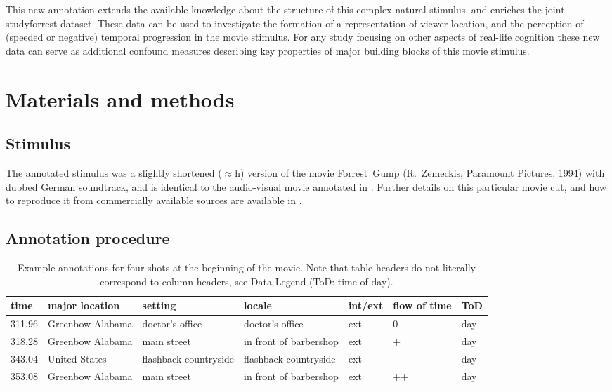 \documentclass[10pt,a4paper]{article}
\begin{document}
\begin{multicols}{2}
This new annotation extends the available knowledge about the structure of this
complex natural stimulus, and enriches the joint studyforrest dataset. These
data can be used to investigate the formation of a representation of viewer
location, and the perception of (speeded or negative) temporal progression in
the movie stimulus. For any study focusing on other aspects of real-life
cognition these new data can serve as additional confound measures describing
key properties of major building blocks of this movie stimulus.


\section*{Materials and methods}

\subsection*{Stimulus}

The annotated stimulus was a slightly shortened ($\approx$\unit[2]{h}) version
of the movie Forrest~Gump (R.~Zemeckis, Paramount Pictures, 1994) with dubbed
German soundtrack, and is identical to the audio-visual movie annotated in
\cite{LRS+2015}. Further details on this particular movie cut, and how to
reproduce it from commercially available sources are available in
\cite{HAK+16}.


\subsection*{Annotation procedure}

\begin{table*}[t]
\caption{Example annotations for four shots at the beginning of the movie. Note
that table headers do not literally correspond to column headers, see Data Legend
(ToD: time of day).}
\label{tab:example}
\begin{tabular}{lllllll}
\toprule
\textbf{time} & \textbf{major location} & \textbf{setting} & \textbf{locale} & \textbf{int/ext} & \textbf{flow of time} & \textbf{ToD}\\
\midrule
311.96  & Greenbow Alabama  & doctor's office  & doctor's office  & ext  & 0 & day\tabularnewline
318.28  & Greenbow Alabama  & main street  & in front of barbershop  & ext  & + & day\tabularnewline
343.04  & United States  & flashback countryside  & flashback countryside  & ext  & - & day\tabularnewline
353.08 & Greenbow Alabama  & main street  & in front of barbershop  & ext  & ++ & day\tabularnewline
\bottomrule
\end{tabular}
\end{table*}



\end{multicols}
\end{document}
